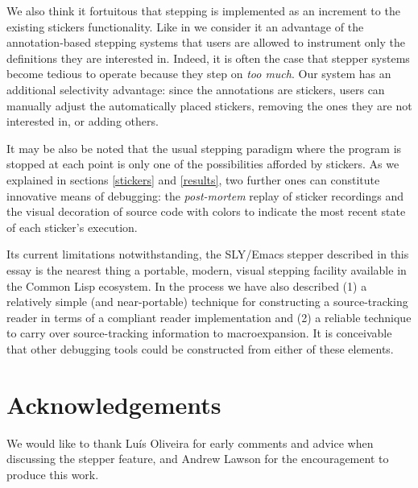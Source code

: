 \documentclass[sigconf]{acmart}
\begin{document}
We also think it fortuitous that stepping is implemented as an
increment to the existing stickers functionality.  Like in
\cite{annotation-based} we consider it an advantage of the
annotation-based stepping systems that users are allowed to instrument
only the definitions they are interested in.  Indeed, it is often the
case that stepper systems become tedious to operate because they step
on \emph{too much}.  Our system has an additional selectivity
advantage: since the annotations are stickers, users can manually
adjust the automatically placed stickers, removing the ones they are
not interested in, or adding others.

It may be also be noted that the usual stepping paradigm where the
program is stopped at each point is only one of the possibilities
afforded by stickers.  As we explained in sections \ref{stickers} and
\ref{results}, two further ones can constitute innovative means of
debugging: the \emph{post-mortem} replay of sticker recordings and the
visual decoration of source code with colors to indicate the most
recent state of each sticker's execution.

Its current limitations notwithstanding, the SLY/Emacs stepper
described in this essay is the nearest thing a portable, modern,
visual stepping facility available in the Common Lisp ecosystem.  In
the process we have also described (1) a relatively simple (and
near-portable) technique for constructing a source-tracking reader in
terms of a compliant reader implementation and (2) a reliable
technique to carry over source-tracking information to macroexpansion.
It is conceivable that other debugging tools could be constructed from
either of these elements.

\section{Acknowledgements}

We would like to thank Luís Oliveira for early comments and advice
when discussing the stepper feature, and Andrew Lawson for the
encouragement to produce this work.




\end{document}
